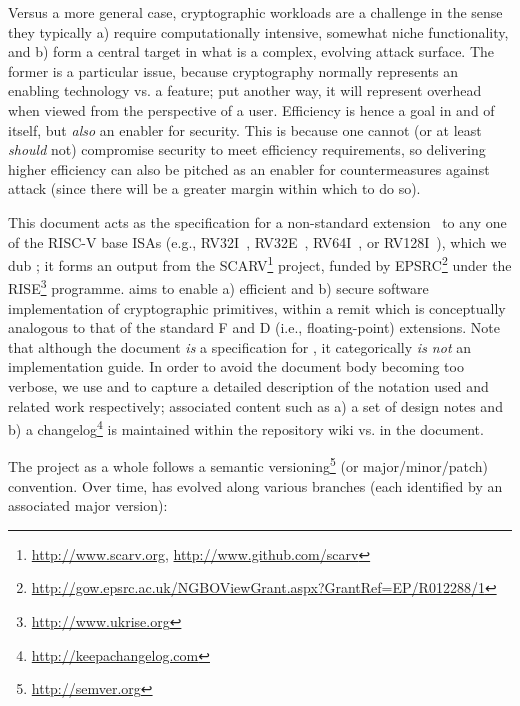 
Versus a more general case, cryptographic workloads are a challenge in the
sense they typically
a) require computationally intensive, somewhat niche functionality,
   and
b) form a central target in what is a complex, evolving attack surface.
The former is a particular issue, because cryptography normally represents
an enabling technology vs. a feature; put another way, it will represent
overhead when viewed from the perspective of a user.  Efficiency is hence 
a goal in and of itself, but {\em also} an enabler for security.  This is
because one cannot (or at least {\em should} not) compromise security to 
meet efficiency requirements, so delivering higher efficiency can also be 
pitched as an enabler for countermeasures against attack (since there will
be a greater margin within which to do so).

This document acts as the specification for a 
non-standard extension~\cite[Section 21.1]{SCARV:RV:ISA:I} 
to any one of the RISC-V base ISAs
(e.g., RV32I~\cite[Section 2]{SCARV:RV:ISA:I}, RV32E~\cite[Section 3]{SCARV:RV:ISA:I}, RV64I~\cite[Section 4]{SCARV:RV:ISA:I}, or RV128I~\cite[Section 5]{SCARV:RV:ISA:I}),
which we dub \XCRYPTO; it forms an output from the SCARV\footnote{
\url{http://www.scarv.org}, \url{http://www.github.com/scarv}
} project, funded by EPSRC\footnote{
\url{http://gow.epsrc.ac.uk/NGBOViewGrant.aspx?GrantRef=EP/R012288/1}
} under the RISE\footnote{
\url{http://www.ukrise.org}
} programme.  
\XCRYPTO aims to enable
a) efficient
   and
b) secure
software implementation of cryptographic primitives, within a remit which
is conceptually analogous to that of the standard F and D
(i.e., floating-point) 
extensions.
Note that although the document {\em is} a specification for \XCRYPTO, it
categorically {\em is not} an implementation guide.  In order to avoid the 
document body becoming too verbose, we use 
and
to capture a detailed description of the notation used and related work
respectively; associated content such as
a) a set of design notes
   and
b) a changelog\footnote{
   \url{http://keepachangelog.com}
   } 
is maintained within the repository wiki vs. in the document.


The \XCRYPTO project as a whole follows a semantic 
versioning\footnote{
\url{http://semver.org}
} (or major/minor/patch) convention.
Over time, \XCRYPTO has evolved along various branches 
(each identified by an associated major version):

